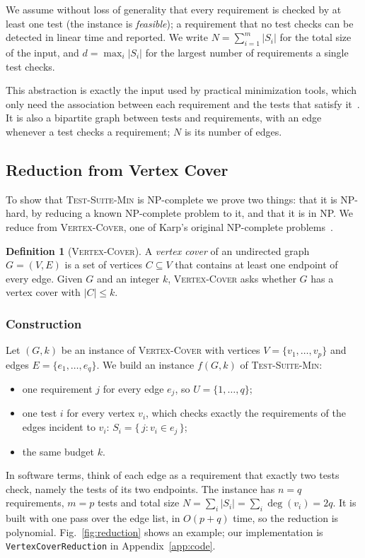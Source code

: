 \documentclass[conference]{IEEEtran}
\theoremstyle{definition}
\newtheorem{definition}{Definition}
\theoremstyle{remark}
\newcommand{\TSM}{\textsc{Test-Suite-Min}}
\newcommand{\VC}{\textsc{Vertex-Cover}}
\begin{document}
We assume without loss of generality that every requirement is checked by at
least one test (the instance is \emph{feasible}); a requirement that no test
checks can be detected in linear time and reported. We write
$N = \sum_{i=1}^{m} |S_i|$ for the total size of the input, and
$d = \max_i |S_i|$ for the largest number of requirements a single test checks.

This abstraction is exactly the input used by practical minimization tools,
which only need the association between each requirement and the tests that
satisfy it~\cite{harrold1993}. It is also a bipartite graph between tests and
requirements, with an edge whenever a test checks a requirement; $N$ is its
number of edges.

\subsection{Reduction from Vertex Cover}
To show that \TSM{} is NP-complete we prove two things: that it is NP-hard,
by reducing a known NP-complete problem to it, and that it is in NP. We
reduce from \VC{}, one of Karp's original NP-complete
problems~\cite{karp1972}.

\begin{definition}[\VC{}]
A \emph{vertex cover} of an undirected graph $G=(V,E)$ is a set of vertices
$C \subseteq V$ that contains at least one endpoint of every edge. Given $G$
and an integer $k$, \VC{} asks whether $G$ has a vertex cover with
$|C| \le k$.
\end{definition}

\subsubsection{Construction}
Let $(G, k)$ be an instance of \VC{} with vertices $V = \{v_1,\dots,v_p\}$ and
edges $E = \{e_1,\dots,e_q\}$. We build an instance $f(G,k)$ of \TSM{}:
\begin{itemize}
  \item one requirement $j$ for every edge $e_j$, so $U = \{1,\dots,q\}$;
  \item one test $i$ for every vertex $v_i$, which checks exactly the
        requirements of the edges incident to $v_i$:
        $S_i = \{\, j : v_i \in e_j \,\}$;
  \item the same budget $k$.
\end{itemize}
In software terms, think of each edge as a requirement that exactly two tests
check, namely the tests of its two endpoints.
The instance has $n = q$ requirements, $m = p$ tests and total size
$N = \sum_i |S_i| = \sum_i \deg(v_i) = 2q$. It is built with one pass over the
edge list, in $O(p + q)$ time, so the reduction is polynomial.
Fig.~\ref{fig:reduction} shows an example; our implementation is
\texttt{VertexCoverReduction} in Appendix~\ref{app:code}.
\end{document}
